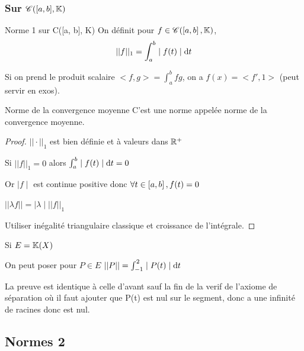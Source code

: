 \subsubsection{Sur \texorpdfstring{$\mathscr C([a, b], \mathbb{K})$}{C([a, b], K)}}

\begin{definition}{Norme 1 sur C([a, b], K)}{}
    On définit pour $f \in \mathscr C(\left[a, b\right], \mathbb{K})$, 
    $$||f||_1 = \int_{a }^{b } \mid f(t) \mid \text d t$$
\end{definition}

\begin{remarque}
    Si on prend le produit scalaire $<f, g> = \int_{a}^{b} fg$, on a 
    $f(x) = <f', 1>$ (peut servir en exos). 
\end{remarque}

\begin{theoreme}{Norme de la convergence moyenne}{}
    C'est une norme appelée norme de la convergence moyenne. 
\end{theoreme}

\begin{proof}
    $||\cdot ||_1$ est bien définie et à valeurs dans $\mathbb{R}^+$

    Si $||f||_1 = 0$ alors $\int_{a }^{b } \mid f(t) \mid \text d t = 0$

    Or $\mid f \mid $ est continue positive donc $\forall t \in \left[a, b\right], f(t) = 0$


    $|| \lambda f || = \mid \lambda \mid ||f||_1$ 


    Utiliser inégalité triangulaire classique et croissance de l'intégrale. 
\end{proof}

\begin{exemple}
    Si $E = \mathbb{K}(X)$
    
    On peut poser pour $P \in E$ $||P|| = \int_{-1}^{2} \mid P(t) \mid \text d t$

    La preuve est identique à celle d'avant sauf la fin de la verif de l'axiome de séparation 
    où il faut ajouter que P(t) est nul sur le segment, donc a une infinité de racines donc
    est nul. 
\end{exemple}

\subsection{Normes 2}

